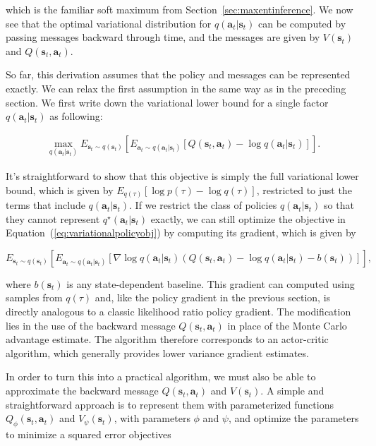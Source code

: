 which is the familiar soft maximum from Section~\ref{sec:maxentinference}. We now see that the optimal variational distribution for $q(\mathbf{a}_t|\mathbf{s}_t)$ can be computed by passing messages backward through time, and the messages are given by $V(\mathbf{s}_t)$ and $Q(\mathbf{s}_t,\mathbf{a}_t)$.

So far, this derivation assumes that the policy and messages can be represented exactly. We can relax the first assumption in the same way as in the preceding section. We first write down the variational lower bound for a single factor $q(\mathbf{a}_t|\mathbf{s}_t)$ as following:

\begin{align}
\max_{q(\mathbf{a}_t|\mathbf{s}_t)} E_{\mathbf{s}_t \sim q(\mathbf{s}_t)} \left[ E_{\mathbf{a}_t \sim q(\mathbf{a}_t|\mathbf{s}_t)}[ Q(\mathbf{s}_t,\mathbf{a}_t) - \log q(\mathbf{a}_t|\mathbf{s}_t) ] \right].\label{eq:variationalpolicyobj}
\end{align}

It's straightforward to show that this objective is simply the full variational lower bound, which is given by $E_{q(\tau)}[\log p(\tau) - \log q(\tau)]$, restricted to just the terms that include $q(\mathbf{a}_t|\mathbf{s}_t)$. If we restrict the class of policies $q(\mathbf{a}_t|\mathbf{s}_t)$ so that they cannot represent $q^\star(\mathbf{a}_t|\mathbf{s}_t)$ exactly, we can still optimize the objective in Equation~(\ref{eq:variationalpolicyobj}) by computing its gradient, which is given by

\begin{equation*}
E_{\mathbf{s}_t \sim q(\mathbf{s}_t)} \left[ E_{\mathbf{a}_t \sim q(\mathbf{a}_t|\mathbf{s}_t)}[ \nabla \log q(\mathbf{a}_t|\mathbf{s}_t) (Q(\mathbf{s}_t,\mathbf{a}_t) - \log q(\mathbf{a}_t|\mathbf{s}_t) - b(\mathbf{s}_t)) ] \right],
\end{equation*}

where $b(\mathbf{s}_t)$ is any state-dependent baseline. This gradient can computed using samples from $q(\tau)$ and, like the policy gradient in the previous section, is directly analogous to a classic likelihood ratio policy gradient. The modification lies in the use of the backward message $Q(\mathbf{s}_t,\mathbf{a}_t)$ in place of the Monte Carlo advantage estimate. The algorithm therefore corresponds to an actor-critic algorithm, which generally provides lower variance gradient estimates.

In order to turn this into a practical algorithm, we must also be able to approximate the backward message $Q(\mathbf{s}_t,\mathbf{a}_t)$ and $V(\mathbf{s}_t)$. A simple and straightforward approach is to represent them with parameterized functions $Q_\phi(\mathbf{s}_t,\mathbf{a}_t)$ and $V_\psi(\mathbf{s}_t)$, with parameters $\phi$ and $\psi$, and optimize the parameters to minimize a squared error objectives

